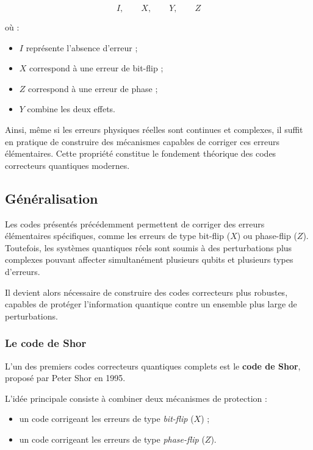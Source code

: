 \documentclass[a4paper,12pt]{article}
\begin{document}
\[
I,
\qquad
X,
\qquad
Y,
\qquad
Z
\]

où :

\begin{itemize}
    \item $I$ représente l’absence d’erreur ;
    \item $X$ correspond à une erreur de bit-flip ;
    \item $Z$ correspond à une erreur de phase ;
    \item $Y$ combine les deux effets.
\end{itemize}

Ainsi, même si les erreurs physiques réelles sont continues et complexes, il suffit en pratique de construire des mécanismes capables de corriger ces erreurs élémentaires. Cette propriété constitue le fondement théorique des codes correcteurs quantiques modernes.

\subsection{Généralisation}

Les codes présentés précédemment permettent de corriger des erreurs élémentaires spécifiques, comme les erreurs de type bit-flip ($X$) ou phase-flip ($Z$). Toutefois, les systèmes quantiques réels sont soumis à des perturbations plus complexes pouvant affecter simultanément plusieurs qubits et plusieurs types d’erreurs.

Il devient alors nécessaire de construire des codes correcteurs plus robustes, capables de protéger l’information quantique contre un ensemble plus large de perturbations.

\subsubsection{Le code de Shor}

L’un des premiers codes correcteurs quantiques complets est le \textbf{code de Shor}, proposé par Peter Shor en 1995.

L’idée principale consiste à combiner deux mécanismes de protection :

\begin{itemize}
    \item un code corrigeant les erreurs de type \textit{bit-flip} ($X$) ;
    \item un code corrigeant les erreurs de type \textit{phase-flip} ($Z$).
\end{itemize}
\end{document}
